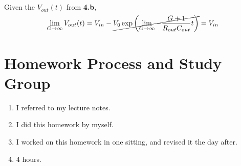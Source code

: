 \documentclass[]{article}
\begin{document}
\subsection{}

Given the \(V_{out}(t)\) from \textbf{4.b},
\begin{equation}
	\lim_{G \to \infty} V_{out}(t) = V_{in} - \cancel{V_0 \exp\left(\lim_{G \to \infty} -\frac{G + 1}{R_{out} C_{out}} t\right)} = V_{in}
\end{equation}


\section{Homework Process and Study Group}

\begin{enumerate}
	\item I referred to my lecture notes.
	\item I did this homework by myself.
	\item I worked on this homework in one sitting, and revised it the day after.
	\item 4 hours.
\end{enumerate}

\newpage

%
\end{document}
